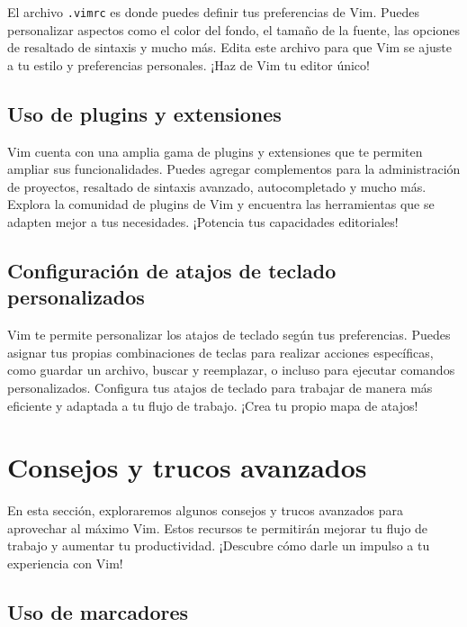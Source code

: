 \documentclass[
  doc,
  floatsintext,
  longtable,
  a4paper,
  nolmodern,
  notxfonts,
  notimes,
  12pt,
  colorlinks=true,linkcolor=blue,citecolor=blue,urlcolor=blue]{apa7}
\begin{document}
El archivo \texttt{.vimrc} es donde puedes definir tus preferencias de
Vim. Puedes personalizar aspectos como el color del fondo, el tamaño de
la fuente, las opciones de resaltado de sintaxis y mucho más. Edita este
archivo para que Vim se ajuste a tu estilo y preferencias personales.
¡Haz de Vim tu editor único!

\subsection{Uso de plugins y
extensiones}\label{uso-de-plugins-y-extensiones}

Vim cuenta con una amplia gama de plugins y extensiones que te permiten
ampliar sus funcionalidades. Puedes agregar complementos para la
administración de proyectos, resaltado de sintaxis avanzado,
autocompletado y mucho más. Explora la comunidad de plugins de Vim y
encuentra las herramientas que se adapten mejor a tus necesidades.
¡Potencia tus capacidades editoriales!

\subsection{Configuración de atajos de teclado
personalizados}\label{configuraciuxf3n-de-atajos-de-teclado-personalizados}

Vim te permite personalizar los atajos de teclado según tus
preferencias. Puedes asignar tus propias combinaciones de teclas para
realizar acciones específicas, como guardar un archivo, buscar y
reemplazar, o incluso para ejecutar comandos personalizados. Configura
tus atajos de teclado para trabajar de manera más eficiente y adaptada a
tu flujo de trabajo. ¡Crea tu propio mapa de atajos!

\section{Consejos y trucos avanzados}\label{consejos-y-trucos-avanzados}

En esta sección, exploraremos algunos consejos y trucos avanzados para
aprovechar al máximo Vim. Estos recursos te permitirán mejorar tu flujo
de trabajo y aumentar tu productividad. ¡Descubre cómo darle un impulso
a tu experiencia con Vim!

\subsection{Uso de marcadores}\label{uso-de-marcadores}
\end{document}
